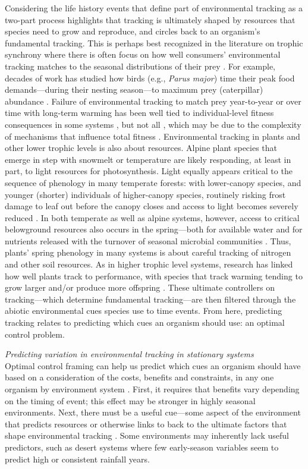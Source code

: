 \documentclass[11pt,letterpaper]{article}
\begin{document}
Considering the life history events that define part of environmental tracking as a two-part process highlights that tracking is ultimately shaped by resources that species need to grow and reproduce, and circles back to an organism's fundamental tracking. This is perhaps best recognized in the literature on trophic synchrony where there is often focus on how well consumers' environmental tracking matches to the seasonal distributions of their prey \citep{deacy2018,kharouba2018}. For example, decades of work has studied how birds (e.g., \emph{Parus major}) time their peak food demands---during their nesting season---to maximum prey (caterpillar) abundance \citep[e.g.,][]{charm2008}. Failure of environmental tracking to match prey year-to-year or over time with long-term warming has been well tied to individual-level fitness consequences in some systems \citep{charm2008}, but not all \citep{visser2006}, which may be due to the complexity of mechanisms that influence total fitness \citep{Singer:2010eb,Johansson2012}. Environmental tracking in plants and other lower trophic levels is also about resources. Alpine plant species that emerge in step with snowmelt or temperature are likely responding, at least in part, to light resources for photosynthesis. Light equally appears critical to the sequence of phenology in many temperate forests: with lower-canopy species, and younger (shorter) individuals of higher-canopy species, routinely risking frost damage to leaf out before the canopy closes and access to light becomes severely reduced \citep{Vitasse2013,heberling2019}. In both temperate as well as alpine systems, however, access to critical belowground resources also occurs in the spring---both for available water and for nutrients released with the turnover of seasonal microbial communities \citep{Zak:1990ar,edwards2010N}. Thus, plants' spring phenology in many systems is about careful tracking of nitrogen and other soil resources. As in higher trophic level systems, research has linked how well plants track to performance, with species that track warming tending to grow larger and/or produce more offspring \citep{Cleland:2012}. These ultimate controllers on tracking---which determine fundamental tracking---are then filtered through the abiotic environmental cues species use to time events. From here, predicting tracking relates to predicting which cues an organism should use: an optimal control problem.

\emph{Predicting variation in environmental tracking in stationary systems}\\
Optimal control framing can help us predict which cues an organism should have based on a consideration of the costs, benefits and constraints, in any one organism by environment system \citep{donahue2015}. First, it requires that benefits vary depending on the timing of event; this effect may be stronger in highly seasonal environments. Next, there must be a useful cue---some aspect of the environment that predicts resources or otherwise links to back to the ultimate factors that shape environmental tracking \citep{gremer2016}. Some environments may inherently lack useful predictors, such as desert systems where few early-season variables seem to predict high or consistent rainfall years. 
\end{document}
